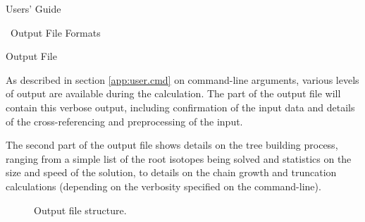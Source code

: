 \begin{chapter}{Users' Guide\label{app:user.guide}}
\begin{section}{\ALARA\ Output File Formats\label{app:user.output}}
    \begin{subsection}{Output File}
      
      As described in section \ref{app:user.cmd} on command-line
      arguments, various levels of output are available during the
      calculation.  The part of the output file will contain
      this verbose output, including confirmation of the input data
      and details of the cross-referencing and preprocessing of the
      input.
      
      The second part of the output file shows details on the tree
      building process, ranging from a simple list of the root
      isotopes being solved and statistics on the size and speed of
      the solution, to details on the chain growth and truncation
      calculations (depending on the verbosity specified on the
      command-line).
      
      \begin{figure}[htbp]
        \begin{center}
        \caption{Output file structure.}
        \label{fig:output.desc}
        \end{center}
      \end{figure}
    

\end{subsection}
\end{section}
\end{chapter}
